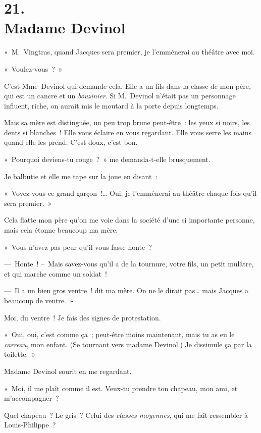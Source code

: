 \documentclass[french,twoside]{book} %
\begin{document}
\section[{21. Madame Devinol}]{21. \\
Madame Devinol}\renewcommand{\leftmark}{21. \\
Madame Devinol}

\noindent « M. Vingtras, quand Jacques sera premier, je l’emmènerai au théâtre avec moi.\par
« Voulez-vous ? »\par
C’est Mme Devinol qui demande cela. Elle a un fils dans la classe de mon père, qui est un cancre et un \emph{bouzinier}. Si M. Devinol n’était pas un personnage influent, riche, on aurait mis le moutard à la porte depuis longtemps.\par
Mais sa mère est distinguée, un peu trop brune peut-être : les yeux si noirs, les dents si blanches ! Elle vous éclaire en vous regardant. Elle vous serre les mains quand elle les prend. C’est doux, c’est bon.\par
« Pourquoi deviens-tu rouge ? » me demanda-t-elle brusquement.\par
Je balbutie et elle me tape sur la joue en disant :\par
« Voyez-vous ce grand garçon !… Oui, je l’emmènerai au théâtre chaque fois qu’il sera premier. »\par
Cela flatte mon père qu’on me voie dans la société d’une si importante personne, mais cela étonne beaucoup ma mère.\par
« Vous n’avez pas peur qu’il vous fasse honte ?\par
— Honte ! – Mais savez-vous qu’il a de la tournure, votre fils, un petit mulâtre, et qui marche comme un soldat !\par
— Il a un bien gros ventre ! dit ma mère. On ne le dirait pas… mais Jacques a beaucoup de ventre. »\par
Moi, du ventre ! Je fais des signes de protestation.\par
« Oui, oui, c’est comme ça ; peut-être moins maintenant, mais tu as eu le \emph{carreau}, mon enfant. (Se tournant vers madame Devinol.) Je dissimule ça par la toilette. »\par
\bigbreak
\noindent Madame Devinol sourit en me regardant.\par
« Moi, il me plaît comme il est. Veux-tu prendre ton chapeau, mon ami, et m’accompagner ?\par
Quel chapeau ? Le gris ? Celui des \emph{classes moyennes}, qui me fait ressembler à Louis-Philippe ?\par
\end{document}

